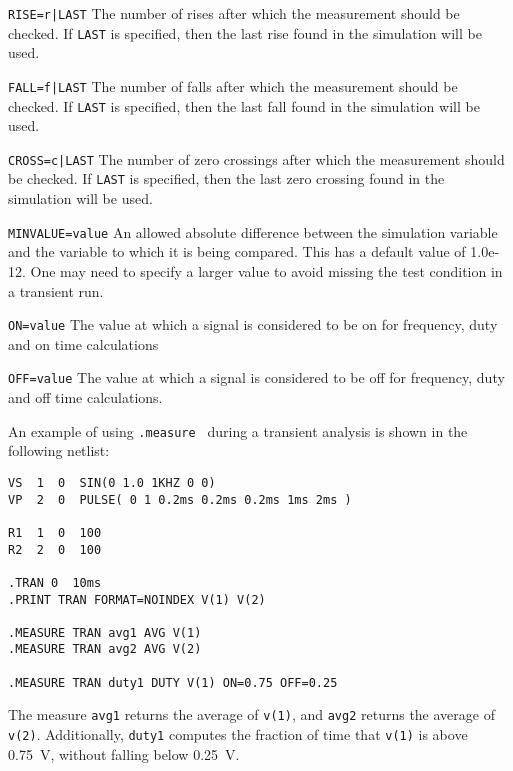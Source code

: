 {{\begin{XyceItemize}
\item \texttt{RISE=r|LAST}  The number of rises after which the measurement should be checked.  If
\texttt{LAST} is specified, then the last rise found in the simulation will be used.

\item \texttt{FALL=f|LAST}
  The number of falls after which the measurement should be checked.  If
  \texttt{LAST} is specified, then the last fall found in the simulation
  will be used.

\item \texttt{CROSS=c|LAST} 
  The number of zero crossings after which the measurement should be checked.  If
  \texttt{LAST} is specified, then the last zero crossing found in the simulation
  will be used.

\item \texttt{MINVALUE=value}
  An allowed absolute difference between the simulation variable and the variable
  to which it is being compared.  This has a default value of 1.0e-12.  One 
  may need to specify a larger value to avoid missing the test condition
  in a transient run.

\item \texttt{ON=value}
  The value at which a signal is considered to be on for frequency, duty and
  on time calculations

\item \texttt{OFF=value}
  The value at which a signal is considered to be off for frequency, duty and
  off time calculations.

\end{XyceItemize}

An example of using \texttt{.measure } during a transient analysis is shown in the following netlist:

\begin{verbatim}
VS  1  0  SIN(0 1.0 1KHZ 0 0)
VP  2  0  PULSE( 0 1 0.2ms 0.2ms 0.2ms 1ms 2ms )

R1  1  0  100
R2  2  0  100

.TRAN 0  10ms
.PRINT TRAN FORMAT=NOINDEX V(1) V(2) 

.MEASURE TRAN avg1 AVG V(1)
.MEASURE TRAN avg2 AVG V(2)

.MEASURE TRAN duty1 DUTY V(1) ON=0.75 OFF=0.25

\end{verbatim}

The measure \texttt{avg1} returns the average of \texttt{v(1)}, and
\texttt{avg2} returns the average of \texttt{v(2)}. Additionally,
\texttt{duty1} computes the fraction of time that \texttt{v(1)} is above
0.75~V, without falling below 0.25~V. 

}}
